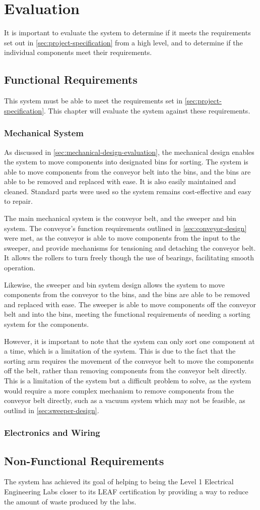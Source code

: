 \section{Evaluation}
\label{sec:evaluation}
It is important to evaluate the system to determine if it meets the requirements set out in \autoref{sec:project-specification} from a high level, and to determine if the individual components meet their requirements. 

\subsection{Functional Requirements}
This system must be able to meet the requirements set in \autoref{sec:project-specification}. This chapter will evaluate the system against these requirements.

\subsubsection{Mechanical System}
As discussed in \autoref{sec:mechanical-design-evaluation}, the mechanical design enables the system to move components into designated bins for sorting. The system is able to move components from the conveyor belt into the bins, and the bins are able to be removed and replaced with ease. It is also easily maintained and cleaned. Standard parts were used so the system remains cost-effective and easy to repair. 

The main mechanical system is the conveyor belt, and the sweeper and bin system. The conveyor's function requirements outlined in \autoref{sec:conveyor-design} were met, as the conveyor is able to move components from the input to the sweeper, and provide mechanisms for tensioning and detaching the conveyor belt. It allows the rollers to turn freely though the use of bearings, facilitating smooth operation.

Likewise, the sweeper and bin system design allows the system to move components from the conveyor to the bins, and the bins are able to be removed and replaced with ease. The sweeper is able to move components off the conveyor belt and into the bins, meeting the functional requirements of needing a sorting system for the components.

However, it is important to note that the system can only sort one component at a time, which is a limitation of the system. This is due to the fact that the sorting arm requires the movement of the conveyor belt to move the components off the belt, rather than removing components from the conveyor belt directly. This is a limitation of the system but a difficult problem to solve, as the system would require a more complex mechanism to remove components from the conveyor belt directly, such as a vacuum system which may not be feasible, as outlind in \autoref{sec:sweeper-design}.

\subsubsection{Electronics and Wiring}


\subsection{Non-Functional Requirements}
The system has achieved its goal of helping to being the Level 1 Electrical Engineering Labs closer to its LEAF certification by providing a way to reduce the amount of waste produced by the labs. 